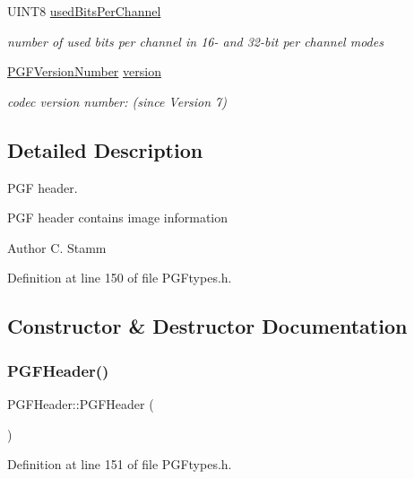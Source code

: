 \begin{DoxyCompactItemize}
U\+I\+N\+T8 \mbox{\hyperlink{structPGFHeader_abddcc9ee6e17690986cf77a6d16aceb6}{used\+Bits\+Per\+Channel}}
\begin{DoxyCompactList}\small\item\em number of used bits per channel in 16-\/ and 32-\/bit per channel modes \end{DoxyCompactList}\item 
\mbox{\hyperlink{structPGFVersionNumber}{P\+G\+F\+Version\+Number}} \mbox{\hyperlink{structPGFHeader_a637699477fb97e62d8cc3c102fac1fbb}{version}}
\begin{DoxyCompactList}\small\item\em codec version number\+: (since Version 7) \end{DoxyCompactList}\end{DoxyCompactItemize}


\subsection{Detailed Description}
P\+GF header. 

P\+GF header contains image information \begin{DoxyAuthor}{Author}
C. Stamm 
\end{DoxyAuthor}


Definition at line 150 of file P\+G\+Ftypes.\+h.



\subsection{Constructor \& Destructor Documentation}
\mbox{\label{structPGFHeader_acdc6457170d5adce40fa0c05d0c09ed2}} 
\subsubsection{\texorpdfstring{PGFHeader()}{PGFHeader()}}
{\footnotesize\ttfamily P\+G\+F\+Header\+::\+P\+G\+F\+Header (\begin{DoxyParamCaption}{ }\end{DoxyParamCaption})\hspace{0.3cm}{\ttfamily [inline]}}



Definition at line 151 of file P\+G\+Ftypes.\+h.


